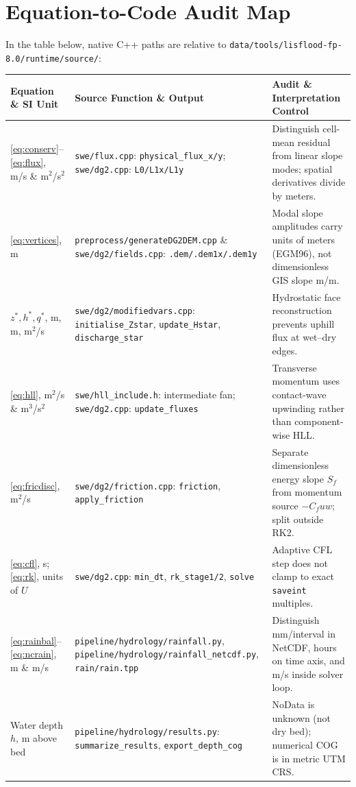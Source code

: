 \documentclass[11pt,a4paper]{article}
\newcommand{\src}[1]{\nolinkurl{#1}}
\begin{document}
\section{Equation-to-Code Audit Map}
\label{sec:mapa}
In the table below, native C++ paths are relative to \src{data/tools/lisflood-fp-8.0/runtime/source/}:
\begin{longtable}{p{.19\linewidth}p{.34\linewidth}p{.38\linewidth}}
\toprule Equation \& SI Unit & Source Function \& Output & Audit \& Interpretation Control\\\midrule\endhead
\eqref{eq:conserv}--\eqref{eq:flux}, m/s \& m$^2$/s$^2$ & \src{swe/flux.cpp}: \texttt{physical\_flux\_x/y}; \src{swe/dg2.cpp}: \texttt{L0/L1x/L1y} & Distinguish cell-mean residual from linear slope modes; spatial derivatives divide by meters.\\
\eqref{eq:vertices}, m & \src{preprocess/generateDG2DEM.cpp} \& \src{swe/dg2/fields.cpp}: \texttt{.dem/.dem1x/.dem1y} & Modal slope amplitudes carry units of meters (EGM96), not dimensionless GIS slope m/m.\\
$z^*,h^*,q^*$, m, m, m$^2$/s & \src{swe/dg2/modifiedvars.cpp}: \texttt{initialise\_Zstar}, \texttt{update\_Hstar}, \texttt{discharge\_star} & Hydrostatic face reconstruction prevents uphill flux at wet--dry edges.\\
\eqref{eq:hll}, m$^2$/s \& m$^3$/s$^2$ & \src{swe/hll_include.h}: intermediate fan; \src{swe/dg2.cpp}: \texttt{update\_fluxes} & Transverse momentum uses contact-wave upwinding rather than component-wise HLL.\\
\eqref{eq:fricdisc}, m$^2$/s & \src{swe/dg2/friction.cpp}: \texttt{friction}, \texttt{apply\_friction} & Separate dimensionless energy slope $S_f$ from momentum source $-C_fuw$; split outside RK2.\\
\eqref{eq:cfl}, s; \eqref{eq:rk}, units of $U$ & \src{swe/dg2.cpp}: \texttt{min\_dt}, \texttt{rk\_stage1/2}, \texttt{solve} & Adaptive CFL step does not clamp to exact \texttt{saveint} multiples.\\
\eqref{eq:rainbal}--\eqref{eq:ncrain}, m \& m/s & \src{pipeline/hydrology/rainfall.py}, \src{pipeline/hydrology/rainfall_netcdf.py}, \src{rain/rain.tpp} & Distinguish mm/interval in NetCDF, hours on time axis, and m/s inside solver loop.\\
Water depth $h$, m above bed & \src{pipeline/hydrology/results.py}: \texttt{summarize\_results}, \texttt{export\_depth\_cog} & NoData is unknown (not dry bed); numerical COG is in metric UTM CRS.\\\bottomrule
\end{longtable}
\end{document}
